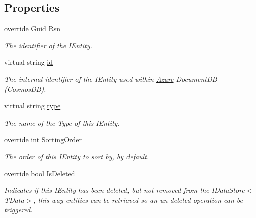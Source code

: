 \subsection*{Properties}
\begin{DoxyCompactItemize}
\item 
override Guid \hyperlink{classCqrs_1_1Azure_1_1DocumentDb_1_1Entities_1_1AzureDocumentDbEntity_a9f8073973963c42fc44bb5fba84cf70a_a9f8073973963c42fc44bb5fba84cf70a}{Rsn}
\begin{DoxyCompactList}\small\item\em The identifier of the I\+Entity. \end{DoxyCompactList}\item 
virtual string \hyperlink{classCqrs_1_1Azure_1_1DocumentDb_1_1Entities_1_1AzureDocumentDbEntity_a70118763769fc358c7206ef04f12ff6f_a70118763769fc358c7206ef04f12ff6f}{id}
\begin{DoxyCompactList}\small\item\em The internal identifier of the I\+Entity used within \hyperlink{namespaceCqrs_1_1Azure}{Azure} Document\+DB (Cosmos\+DB). \end{DoxyCompactList}\item 
virtual string \hyperlink{classCqrs_1_1Azure_1_1DocumentDb_1_1Entities_1_1AzureDocumentDbEntity_a4696c1d70da779b260ba76588aff80a7_a4696c1d70da779b260ba76588aff80a7}{type}
\begin{DoxyCompactList}\small\item\em The name of the Type of this I\+Entity. \end{DoxyCompactList}\item 
override int \hyperlink{classCqrs_1_1Azure_1_1DocumentDb_1_1Entities_1_1AzureDocumentDbEntity_a65addaa44fbb57497e730f4f806bc820_a65addaa44fbb57497e730f4f806bc820}{Sorting\+Order}
\begin{DoxyCompactList}\small\item\em The order of this I\+Entity to sort by, by default. \end{DoxyCompactList}\item 
override bool \hyperlink{classCqrs_1_1Azure_1_1DocumentDb_1_1Entities_1_1AzureDocumentDbEntity_ad661caf71eb892518fef8c3a5959e2c3_ad661caf71eb892518fef8c3a5959e2c3}{Is\+Deleted}
\begin{DoxyCompactList}\small\item\em Indicates if this I\+Entity has been deleted, but not removed from the I\+Data\+Store$<$\+T\+Data$>$, this way entities can be retrieved so an un-\/deleted operation can be triggered. \end{DoxyCompactList}\end{DoxyCompactItemize}



